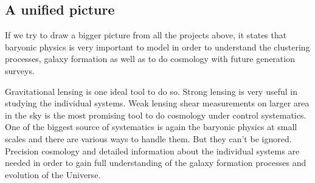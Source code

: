 \subsection{A unified picture}

If we try to draw a bigger picture from all the projects above, it states that
baryonic physics is very important to model in order to understand the clustering processes,
galaxy formation as well as to do cosmology with future generation surveys. 

Gravitational lensing is one ideal tool to do so. Strong lensing
is very useful in studying the individual systems. 
Weak lensing shear measurements
on larger area in the sky is the most promising tool to do cosmology under
control systematics. One of the biggest source of systematics is again the 
baryonic physics at small scales and there are various ways to handle them. But
they can't be ignored. Precision cosmology and detailed information about the 
individual systems are needed in order to gain full understanding of the 
galaxy formation processes and evolution of the Universe. 







\clearpage
\cite{2014MNRAS.440.2290M}

\cite{2014MNRAS.439.2651M}

\cite{2014A&A...567A..65B}

\cite{2014MNRAS.445.3382M}

\cite{2014arXiv1410.6826M}

\cite{2015PASJ...67...21M}

\cite{2015arXiv150403388M}





